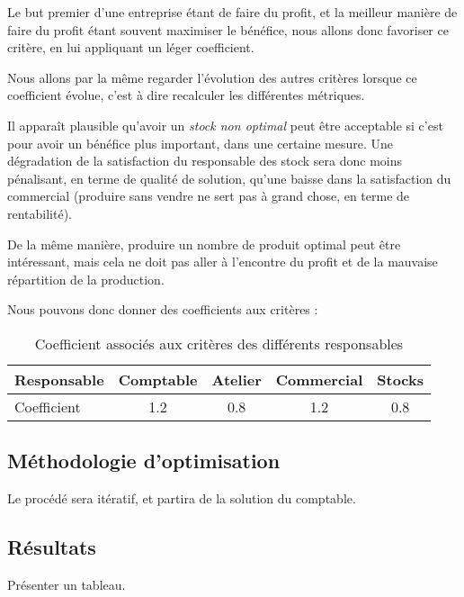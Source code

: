 Le but premier d'une entreprise étant de faire du profit, et la meilleur manière de
faire du profit étant souvent maximiser le bénéfice, nous allons donc favoriser
ce critère, en lui appliquant un léger coefficient.

Nous allons par la même regarder l'évolution des autres critères lorsque ce
coefficient évolue, c'est à dire recalculer les différentes métriques.

Il apparaît plausible qu'avoir un \emph{stock non optimal} peut être acceptable
si c'est pour avoir un bénéfice plus important, dans une certaine mesure. Une
dégradation de la satisfaction du responsable des stock sera donc moins
pénalisant, en terme de qualité de solution, qu'une baisse dans la satisfaction
du commercial (produire sans vendre ne sert pas à grand chose, en terme de
rentabilité).

De la même manière, produire un nombre de produit optimal peut être
intéressant, mais cela ne doit pas aller à l'encontre du profit et de la
mauvaise répartition de la production.

Nous pouvons donc donner des coefficients aux critères :

\begin{table}[h!]
\begin{center}
\begin{tabular}{|l||c|c|c|c|}
\hline
    Responsable & Comptable & Atelier & Commercial & Stocks \\
	\hline
    Coefficient & 1.2	    & 0.8     & 1.2	& 0.8 \\
	\hline
	\end{tabular}
	\end{center}
\caption{Coefficient associés aux critères des différents responsables}
\end{table}

\subsection{Méthodologie d'optimisation}
Le procédé sera itératif, et partira de la solution du comptable. 
\subsection{Résultats}
Présenter un tableau.
